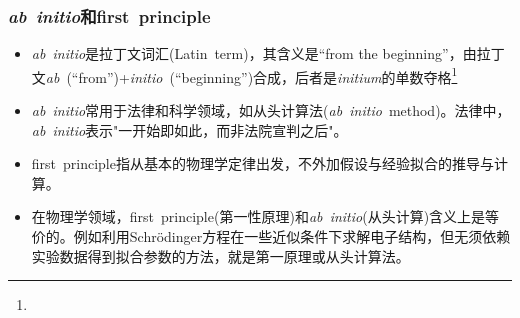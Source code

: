{%
%
\frame
{
	\frametitle{\textit{ab~initio}和\textrm{first~principle}}
	\begin{itemize}
		\item \textit{ab~initio}是拉丁文词汇\textrm{(Latin~term)}，其含义是\textrm{``from the beginning''}，由拉丁文\textit{ab}~\textrm{(``from'')}+\textit{initio}~\textrm{(``beginning'')}合成，后者是\textit{initium}的单数夺格\footnote{\fontsize{5.5pt}{4.2pt}}
		\item \textit{ab~initio}常用于法律和科学领域，如从头计算法(\textit{ab~initio}~\textrm{method})。法律中，\textit{ab~initio}表示"一开始即如此，而非法院宣判之后"。
		\item \textrm{first~principle}指从基本的物理学定律出发，不外加假设与经验拟合的推导与计算。
		\item 在物理学领域，\textrm{first~principle}(第一性原理)和\textit{ab~initio}(从头计算)含义上是等价的。例如利用\textrm{Schr\"odinger}方程在一些近似条件下求解电子结构，但无须依赖实验数据得到拟合参数的方法，就是第一原理或从头计算法。
	\end{itemize}
}

}
